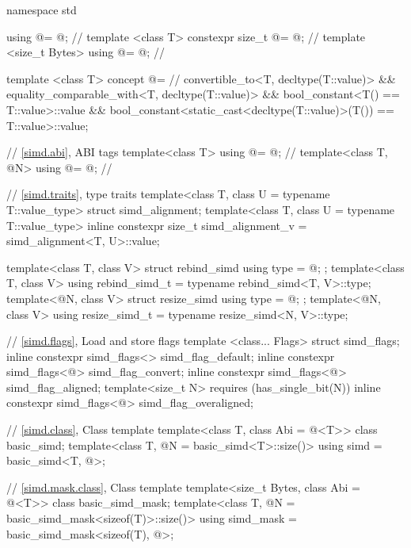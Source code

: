 \begin{codeblock}
namespace std {
  using @\simdsizetype@ = @\seebelow@; // \expos
  template <class T> constexpr size_t @\maskelementsize@ = @\seebelow@; // \expos
  template <size_t Bytes> using @\integerfrom@ = @\seebelow@; // \expos

  template <class T>
    concept @\constexprwrapperlike@ =                     // \expos
      convertible_to<T, decltype(T::value)> &&
      equality_comparable_with<T, decltype(T::value)> &&
      bool_constant<T() == T::value>::value &&
      bool_constant<static_cast<decltype(T::value)>(T()) == T::value>::value;

  // \ref{simd.abi},  ABI tags
  template<class T> using @\nativeabi@ = @\seebelow@; // \expos
  template<class T, @\simdsizetype@ N> using @\deducet@ = @\seebelow@; // \expos

  // \ref{simd.traits},  type traits
  template<class T, class U = typename T::value_type> struct simd_alignment;
  template<class T, class U = typename T::value_type>
    inline constexpr size_t simd_alignment_v = simd_alignment<T, U>::value;

  template<class T, class V> struct rebind_simd { using type = @\seebelow@; };
  template<class T, class V> using rebind_simd_t = typename rebind_simd<T, V>::type;
  template<@\simdsizetype@ N, class V> struct resize_simd { using type = @\seebelow@; };
  template<@\simdsizetype@ N, class V> using resize_simd_t = typename resize_simd<N, V>::type;

  // \ref{simd.flags}, Load and store flags
  template <class... Flags> struct simd_flags;
  inline constexpr simd_flags<> simd_flag_default{};
  inline constexpr simd_flags<@\seebelow@> simd_flag_convert{};
  inline constexpr simd_flags<@\seebelow@> simd_flag_aligned{};
  template<size_t N> requires (has_single_bit(N))
    inline constexpr simd_flags<@\seebelow@> simd_flag_overaligned{};

  // \ref{simd.class}, Class template 
  template<class T, class Abi = @\nativeabi@<T>> class basic_simd;
  template<class T, @\simdsizetype@ N = basic_simd<T>::size()>
    using simd = basic_simd<T, @>;

  // \ref{simd.mask.class}, Class template 
  template<size_t Bytes, class Abi = @\nativeabi@<T>> class basic_simd_mask;
  template<class T, @\simdsizetype@ N = basic_simd_mask<sizeof(T)>::size()>
    using simd_mask = basic_simd_mask<sizeof(T), @>;

}
\end{codeblock}
